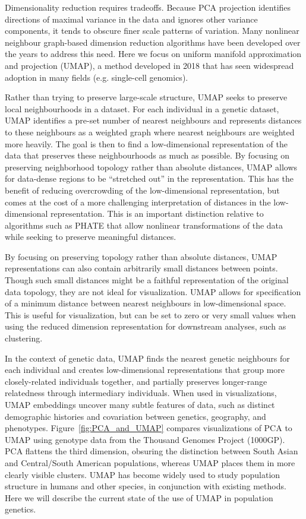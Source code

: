 \documentclass[12pt]{article}
\begin{document}
Dimensionality reduction requires tradeoffs. Because PCA projection identifies directions of maximal variance in the data and ignores other variance components, it tends to obscure finer scale patterns of variation. Many nonlinear neighbour graph-based dimension reduction algorithms have been developed over the years to address this need. Here we focus on uniform manifold approximation and projection (UMAP)\cite{mcinnes_umap_2018}, a method developed in 2018 that has seen widespread adoption in many fields (e.g. single-cell genomics\cite{becht_dimensionality_2019}). 

Rather than trying to preserve large-scale structure, UMAP seeks to preserve local neighbourhoods in a dataset. For each individual in a genetic dataset, UMAP identifies a pre-set number of nearest neighbours and represents distances to these neighbours as a weighted graph where nearest neighbours are weighted more heavily. The goal is then to find a low-dimensional representation of the data that preserves these neighbourhoods as much as possible. By focusing on preserving neighborhood topology rather than absolute distances, UMAP allows for data-dense regions to be ``stretched out'' in the representation. This has the benefit of reducing overcrowding of the low-dimensional representation, but comes at the cost of a more challenging interpretation of distances in the low-dimensional representation.  This is an important distinction relative to algorithms such as PHATE \cite{moon2019visualizing} that allow nonlinear transformations of the data while seeking to preserve meaningful distances. 

By focusing on preserving topology rather than absolute distances, UMAP representations can also contain arbitrarily small distances between points. Though such small distances might be a faithful representation of the original data topology, they are not ideal for visualization. UMAP allows for specification of a minimum distance between nearest neighbours in low-dimensional space. This is useful for visualization, but can be set to zero or very small values when using the reduced dimension representation for downstream analyses, such as clustering.

In the context of genetic data, UMAP finds the nearest genetic neighbours for each individual and creates low-dimensional representations that group more closely-related individuals together, and partially preserves longer-range relatedness through intermediary individuals. When used in visualizations, UMAP embeddings uncover many subtle features of data, such as distinct demographic histories and covariation between genetics, geography, and phenotypes\cite{diaz-papkovich_umap_2019}. Figure~\ref{fig:PCA_and_UMAP} compares visualizations of PCA to UMAP using genotype data from the Thousand Genomes Project (1000GP)\cite{10002015global}. PCA flattens the third dimension, obsuring the distinction between South Asian and Central/South American populations, whereas UMAP places them in more clearly visible clusters. UMAP has become widely used to study population structure in humans and other species, in conjunction with existing methods. Here we will describe the current state of the use of UMAP in population genetics.
\end{document}
